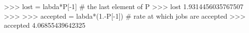 
>>> lost = labda*P[-1] # the last element of P
>>> lost
1.9314456035767507
>>>
>>> accepted = labda*(1.-P[-1]) # rate at which jobs are accepted
>>> accepted
4.06855439642325


